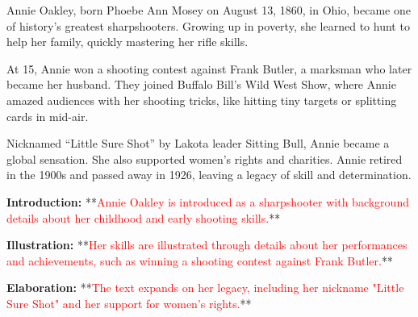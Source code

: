 \documentclass[12pt]{article}
\begin{document}
\begin{tcolorbox}[colframe=black!60, colback=white, 
coltitle=black, colbacktitle=black!15, fonttitle=\bfseries\Large, 
title=Text: Annie Oakley's Life, halign title=center, left=10pt, right=10pt, top=10pt, bottom=15pt]

Annie Oakley, born Phoebe Ann Mosey on August 13, 1860, in Ohio, became one of history’s greatest sharpshooters. Growing up in poverty, she learned to hunt to help her family, quickly mastering her rifle skills.

At 15, Annie won a shooting contest against Frank Butler, a marksman who later became her husband. They joined Buffalo Bill’s Wild West Show, where Annie amazed audiences with her shooting tricks, like hitting tiny targets or splitting cards in mid-air.

Nicknamed “Little Sure Shot” by Lakota leader Sitting Bull, Annie became a global sensation. She also supported women’s rights and charities. Annie retired in the 1900s and passed away in 1926, leaving a legacy of skill and determination.

\end{tcolorbox}

\vspace{1em}

\begin{tcolorbox}[colframe=black!60, colback=white, 
coltitle=black, colbacktitle=black!15, fonttitle=\bfseries\Large, 
title=Example: Mapping the Development of a Text, halign title=center, left=10pt, right=10pt, top=10pt, bottom=15pt]

\textbf{Introduction:} **\textcolor{red}{Annie Oakley is introduced as a sharpshooter with background details about her childhood and early shooting skills.}**  

\textbf{Illustration:} **\textcolor{red}{Her skills are illustrated through details about her performances and achievements, such as winning a shooting contest against Frank Butler.}**  

\textbf{Elaboration:} **\textcolor{red}{The text expands on her legacy, including her nickname "Little Sure Shot" and her support for women's rights.}**  

\end{tcolorbox}

\vspace{1em}
\end{document}
